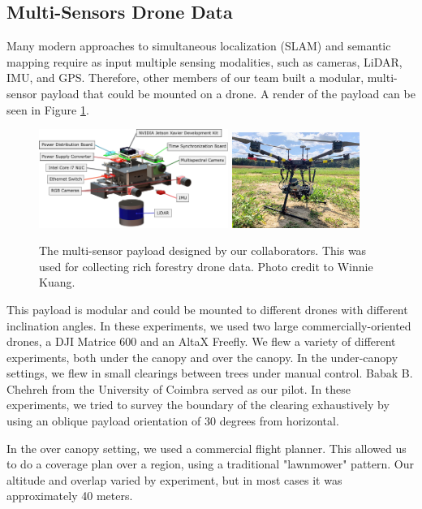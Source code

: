\subsection{Multi-Sensors Drone Data}
Many modern approaches to simultaneous localization (SLAM) and semantic mapping require as input multiple sensing modalities, such as cameras, LiDAR, IMU, and GPS. Therefore, other members of our team built a modular, multi-sensor payload that could be mounted on a drone. A render of the payload can be seen in Figure \ref{fig:methods:payload}. 

\begin{figure}
    \centering
    \includegraphics[width=0.55\textwidth]{figs/methods/datasets/payload_annotated.pdf}
    \hfill
    \includegraphics[width=0.37\textwidth]{figs/methods/datasets/payload_on_drone.jpeg}
    \caption{The multi-sensor payload designed by our collaborators. This was used for collecting rich forestry drone data. Photo credit to Winnie Kuang.}
    \label{fig:methods:payload}
\end{figure}

This payload is modular and could be mounted to different drones with different inclination angles. In these experiments, we used two large commercially-oriented drones, a DJI Matrice 600 and an AltaX Freefly. We flew a variety of different experiments, both under the canopy and over the canopy. In the under-canopy settings, we flew in small clearings between trees under manual control. Babak B. Chehreh from the University of Coimbra served as our pilot. In these experiments, we tried to survey the boundary of the clearing exhaustively by using an oblique payload orientation of 30 degrees from horizontal.

In the over canopy setting, we used a commercial flight planner. This allowed us to do a coverage plan over a region, using a traditional "lawnmower" pattern. Our altitude and overlap varied by experiment, but in most cases it was approximately 40 meters.


